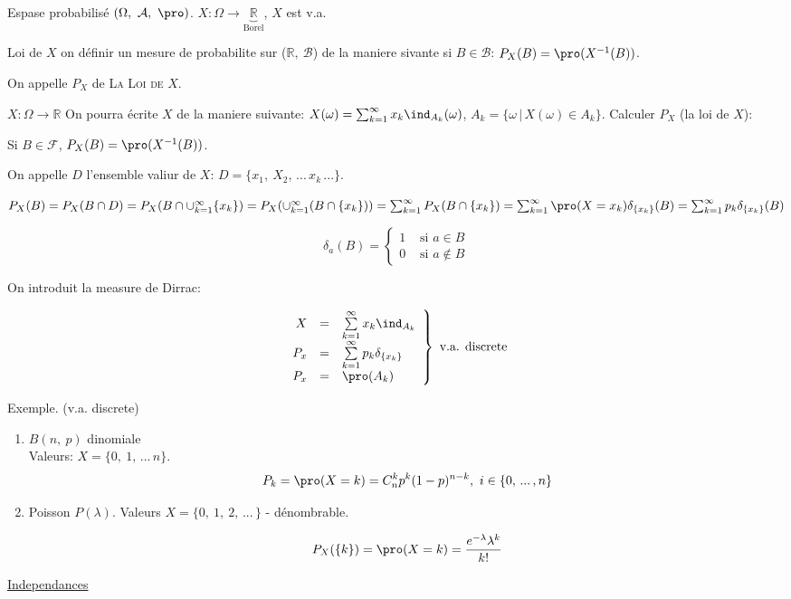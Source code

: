 Espase probabilisé $(\Omega,\ \mathcal{A},\ \pro )$. $X:\Omega\rightarrow\underbrace{\mathbb{R}}_\text{Borel}$,  $X$ est v.a. 

Loi de $X$ on définir un mesure de probabilite sur ($\mathbb{R},\ \mathcal{B}$) de la maniere sivante si $B\in\mathcal{B}$: $P_X(B)=\pro (X^{-1}(B))$.

On appelle $P_X$ de \textsc{La Loi de $X$}.

$X:\Omega\rightarrow\mathbb{R}$ On pourra écrite $X$ de la maniere suivante: $X(\omega)=\sum_{k=1}^\infty x_k \ind _{A_k}(\omega)$, $A_k=\{\omega\, |\, X(\omega)\in A_k\}$. Calculer $P_X$ (la loi de $X$):

Si $B\in\mathcal{F}$, $P_X(B) = \pro (X^{-1}(B))$.

On appelle $D$ l'ensemble valiur de $X$: $D=\{x_1,\ X_2,\, ...\,x_k\, ...\}$.

$P_X(B)=P_X(B\cap D)=P_X(B\cap \cup_{k=1}^\infty\{x_k\})=P_X(\cup_{k=1}^\infty(B\cap \{x_k\}))=\sum_{k=1}^\infty P_X(B\cap \{x_k\})=\sum_{k=1}^\infty \pro (X=x_k)\delta_{\{x_k\}}(B)=\sum_{k=1}^\infty p_k \delta_{\{x_k\}}(B)$

$$\delta_a(B)=\left\{
\begin{array}{rl}
	1 & \mbox{ si } a\in B \\ 
	0 & \mbox{ si } a\notin B
\end{array}\right.$$

On introduit la measure de Dirrac:

$$\left. \begin{array}{rrl}
	X & = &\sum\limits_{k=1}^\infty x_k \ind _{A_k}\\ 
	P_x & = & \sum\limits_{k=1}^\infty p_k \delta_{\{x_k\}}\\
	P_x & = & \pro (A_k)
\end{array}\right\}\text{ v.a. discrete}$$

Exemple. (v.a. discrete)
\begin{enumerate}
	
	\item $B(n,\ p)$ dinomiale\\
Valeurs: $X=\{0,\ 1,\,...\, n\}$.
$$P_k=\pro (X=k)=C_n^k p^k (1-p)^{n-k},\ i\in\{0,\, ...\,, n\}$$
	\item Poisson $P(\lambda)$. Valeurs $X=\{0,\ 1,\ 2,\, ...\,\}$ - dénombrable.
	
	$$P_X(\{k\})=\pro (X=k)=\frac{e^{-\lambda}\lambda^k}{k!}$$ 
\end{enumerate}

\underline{Independances}

